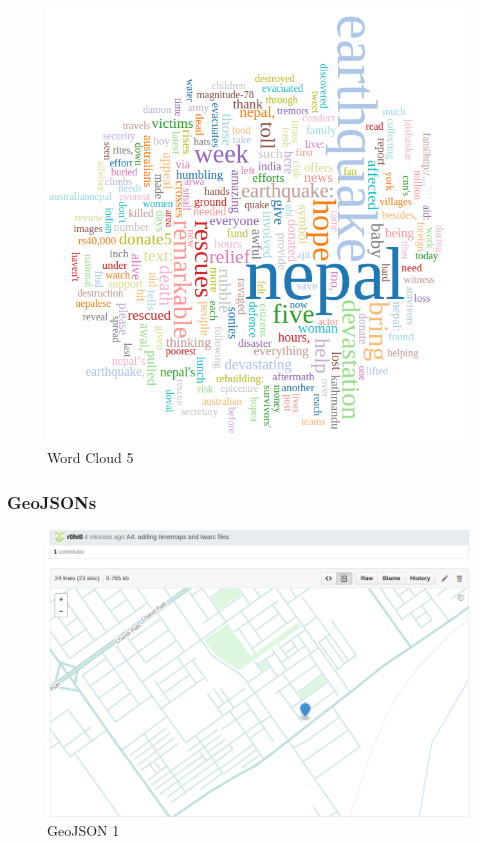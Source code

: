 \begin{enumerate}
\newpage
\begin{figure}[ht]    
    \begin{center}
        \includegraphics[scale=0.40]{graphs/wc5.png}
        \caption{Word Cloud 5}
    \end{center}
\end{figure}

\newpage
\newpage
\newpage
\subsubsection{GeoJSONs}
\begin{figure}[ht]    
    \begin{center}
        \includegraphics[scale=0.40]{graphs/gj1.png}
        \caption{GeoJSON 1}
    \end{center}
\end{figure}


\end{enumerate}
